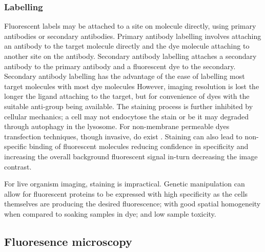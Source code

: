 \subsubsection{Labelling}

Fluorescent labels may be attached to a site on molecule directly, using primary antibodies or secondary antibodies.
Primary antibody labelling involves attaching an antibody to the target molecule directly and the dye molecule attaching to another site on the antibody.
Secondary antibody labelling attaches a secondary antibody to the primary antibody and a fluorescent dye to the secondary.
Secondary antibody labelling has the advantage of the ease of labelling most target molecules with most dye molecules
However, imaging resolution is lost the longer the ligand attaching to the target, but for convenience of dyes with the suitable anti-group being available.
The staining process is further inhibited by cellular mechanics; a cell may not endocytose the stain or be it may degraded through \gls{autophagy} in the \gls{lysosome}.
For non-membrane permeable dyes \gls{transfection} techniques, though invasive, do exist \cite{}.
Staining can also lead to non-specific binding of fluorescent molecules reducing confidence in specificity and increasing the overall background fluorescent signal in-turn decreasing the image contrast.

For live organism imaging, staining is impractical.
Genetic manipulation can allow for fluorescent proteins to be expressed with high specificity as the cells themselves are producing the desired fluorescence; with good spatial homogeneity when compared to soaking samples in dye; and low sample toxicity.


\subsection{Fluoresence microscopy}

